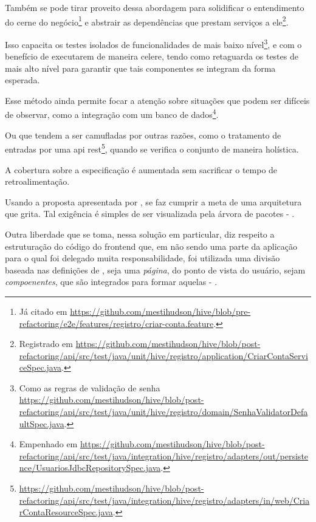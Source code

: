   Também se pode tirar proveito dessa abordagem para solidificar o entendimento do cerne do negócio\footnote{Já citado em \url{https://github.com/mestihudson/hive/blob/pre-refactoring/e2e/features/registro/criar-conta.feature}.} e abstrair as dependências que prestam serviços a ele\footnote{Registrado em \url{https://github.com/mestihudson/hive/blob/post-refactoring/api/src/test/java/unit/hive/registro/application/CriarContaServiceSpec.java}.}.

  Isso capacita os testes isolados de funcionalidades de mais baixo nível\footnote{Como as regras de validação de senha \url{https://github.com/mestihudson/hive/blob/post-refactoring/api/src/test/java/unit/hive/registro/domain/SenhaValidatorDefaultSpec.java}.}, e com o benefício de executarem de maneira celere, tendo como retaguarda os testes de mais alto nível para garantir que tais componentes se integram da forma esperada.

  Esse método ainda permite focar a atenção sobre situações que podem ser difíceis de observar, como a integração com um banco de dados\footnote{Empenhado em \url{https://github.com/mestihudson/hive/blob/post-refactoring/api/src/test/java/integration/hive/registro/adapters/out/persistence/UsuariosJdbcRepositorySpec.java}.}.

  Ou que tendem a ser camufladas por outras razões, como o tratamento de entradas por uma api rest\footnote{\url{https://github.com/mestihudson/hive/blob/post-refactoring/api/src/test/java/integration/hive/registro/adapters/in/web/CriarContaResourceSpec.java}.}, quando se verifica o conjunto de maneira holística.

  A cobertura sobre a especificação é aumentada sem sacrificar o tempo de retroalimentação.

  Usando a proposta apresentada por , se faz cumprir a meta de uma arquitetura que grita. Tal exigência é simples de ser visualizada pela árvora de pacotes - .

  Outra liberdade que se toma, nessa solução em particular, diz respeito a estruturação do código do frontend que, em não sendo uma parte da aplicação para o qual foi delegado muita responsabilidade, foi utilizada uma divisão baseada nas definições de , seja uma \emph{página}, do ponto de vista do usuário, sejam \emph{compoenentes}, que são integrados para formar aquelas - .

